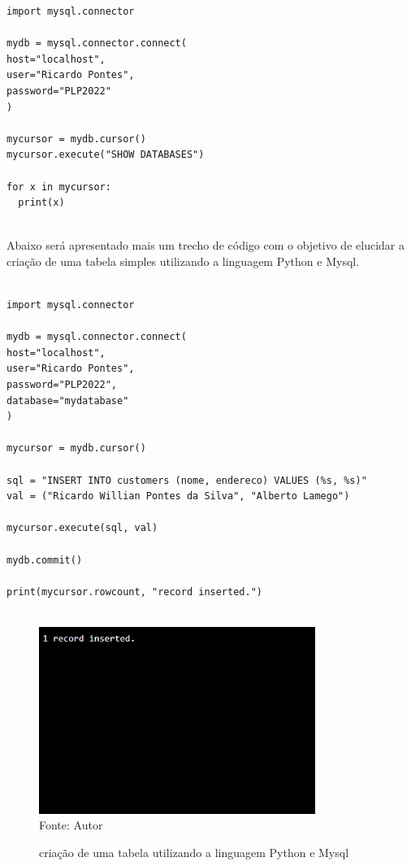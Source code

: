 \begin{lstlisting}
import mysql.connector
	
mydb = mysql.connector.connect(
host="localhost",
user="Ricardo Pontes",
password="PLP2022"
)

mycursor = mydb.cursor()
mycursor.execute("SHOW DATABASES")
	
for x in mycursor:
  print(x)
	
\end{lstlisting}

Abaixo será apresentado mais um trecho de código com o objetivo de elucidar a criação de uma tabela simples utilizando a linguagem Python e Mysql.

\begin{lstlisting}

import mysql.connector

mydb = mysql.connector.connect(
host="localhost",
user="Ricardo Pontes",
password="PLP2022",
database="mydatabase"
)

mycursor = mydb.cursor()

sql = "INSERT INTO customers (nome, endereco) VALUES (%s, %s)"
val = ("Ricardo Willian Pontes da Silva", "Alberto Lamego")

mycursor.execute(sql, val)

mydb.commit()

print(mycursor.rowcount, "record inserted.")
	
\end{lstlisting}

 \begin{figure}[H]
	\begin{center}
		\caption{criação de uma tabela utilizando a linguagem Python e Mysql} \label{ling1}
		\includegraphics[width=9cm]{database.PNG} \\
		{\tiny \sf Fonte:{ Autor}}
	\end{center}
\end{figure}
